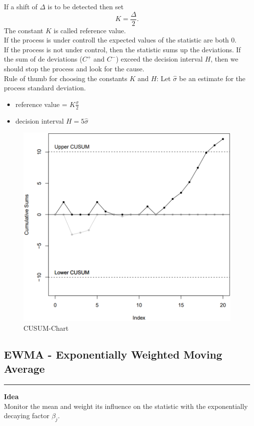 If a shift of $\Delta$ is to be detected then set
\begin{equation}
  K = \frac{\Delta}{2}.
\end{equation}
The constant $K$ is called reference value.\\

If the process is under controll the expected values of the statistic are both 0.\\
If the process is not under control, then the statistic sums up the deviations. If the sum of de deviations ($C^+$ and $C^-$) exceed the decision interval $H$, then we should stop the process and look for the cause.\\

Rule of thumb for choosing the constants $K$ and $H$:
Let $\hat{\sigma}$ be an estimate for the process standard deviation.\\
\begin{itemize}
  \item reference value = $K \frac{\hat{\sigma}}{2}$
  \item decision interval $H = 5\hat{\sigma}$
\end{itemize}

\begin{figure}[H]
  \centering
  \includegraphics[width=0.8\linewidth]{Pics/4.1.png}
  \caption{CUSUM-Chart}
  \label{CUSUM}
\end{figure}


\subsection{EWMA - Exponentially Weighted Moving Average}
\noindent\rule[\linienAbstand]{\linewidth}{\linienDicke}
\textbf{Idea}\\
Monitor the mean and weight its influence on the statistic with the exponentially decaying factor $\beta_j$.\\

